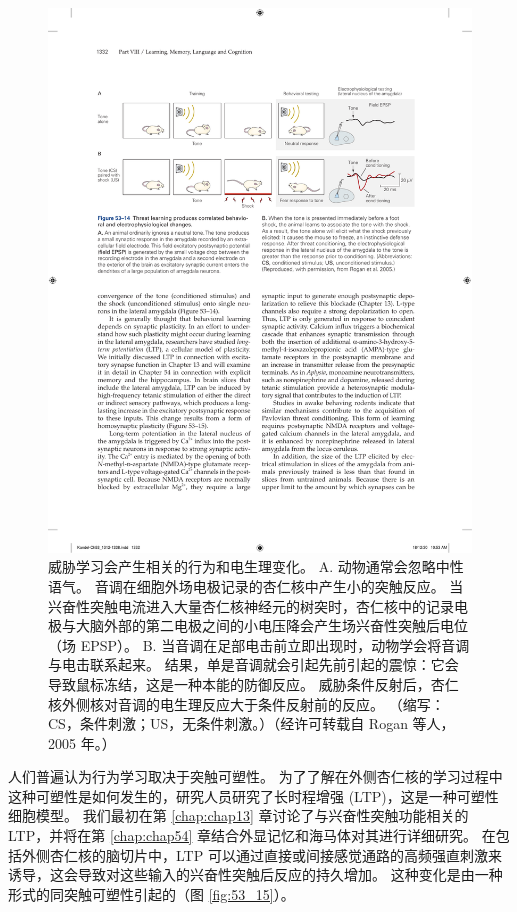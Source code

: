 \begin{figure}[htbp]
	\centering
	\includegraphics[width=0.95\linewidth]{chap53/fig_53_14}
	\caption{威胁学习会产生相关的行为和电生理变化。 A. 动物通常会忽略中性语气。 音调在细胞外场电极记录的杏仁核中产生小的突触反应。 当兴奋性突触电流进入大量杏仁核神经元的树突时，杏仁核中的记录电极与大脑外部的第二电极之间的小电压降会产生场兴奋性突触后电位（场 EPSP）。 B. 当音调在足部电击前立即出现时，动物学会将音调与电击联系起来。 结果，单是音调就会引起先前引起的震惊：它会导致鼠标冻结，这是一种本能的防御反应。 威胁条件反射后，杏仁核外侧核对音调的电生理反应大于条件反射前的反应。 （缩写：CS，条件刺激；US，无条件刺激。）（经许可转载自 Rogan 等人，2005 年。）}
	\label{fig:53_14}
\end{figure}

人们普遍认为行为学习取决于突触可塑性。 为了了解在外侧杏仁核的学习过程中这种可塑性是如何发生的，研究人员研究了长时程增强 (LTP)，这是一种可塑性细胞模型。 我们最初在第 \ref{chap:chap13} 章讨论了与兴奋性突触功能相关的 LTP，并将在第 \ref{chap:chap54} 章结合外显记忆和海马体对其进行详细研究。 在包括外侧杏仁核的脑切片中，LTP 可以通过直接或间接感觉通路的高频强直刺激来诱导，这会导致对这些输入的兴奋性突触后反应的持久增加。 这种变化是由一种形式的同突触可塑性引起的（图 \ref{fig:53_15}）。

